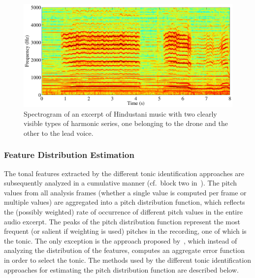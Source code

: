 \begin{figure}
	\begin{center}
		\includegraphics[width=\figSizeNinety]{ch02_background/figures/2HarmonicSeries.pdf}
	\end{center}
	\caption[Spectogram of an excerpt of Hindustani music]{Spectrogram of an excerpt of Hindustani music with two clearly visible types of harmonic series, one belonging to the drone and the other to the lead voice.}
	\label{fig:2HarmonicSeries}
\end{figure}


\subsubsection{Feature Distribution Estimation}
\label{sec:background_tonic_feature_distribution_estimation}

The tonal features extracted by the different tonic identification approaches are subsequently analyzed in a cumulative manner (cf.~block two in~). The pitch values from all analysis frames (whether a single value is computed per frame or multiple values) are aggregated into a pitch distribution function, which reflects the (possibly weighted) rate of occurrence of different pitch values in the entire audio excerpt. The peaks of the pitch distribution function represent the most frequent (or salient if weighting is used) pitches in the recording, one of which is the tonic. The only exception is the approach proposed by~\cite{Sengupta2005b}, which instead of analyzing the distribution of the features, computes an aggregate error function in order to select the tonic. The methods used by the different tonic identification approaches for estimating the pitch distribution function are described below.


